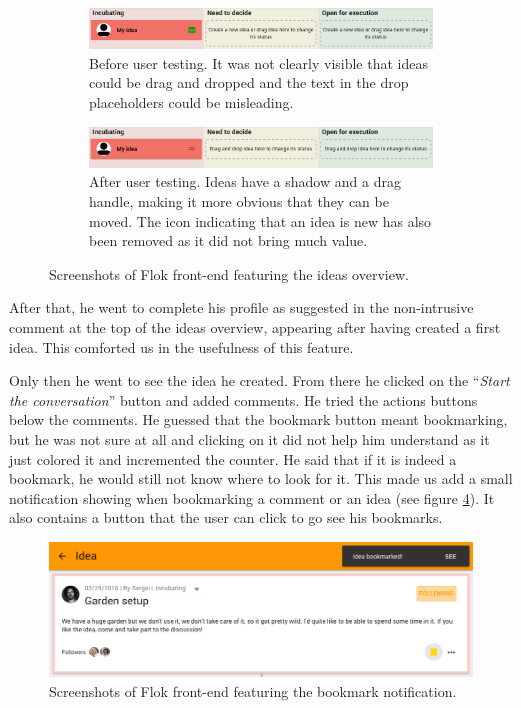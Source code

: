 \documentclass[a4paper,12pt, oneside]{article}
\begin{document}
\begin{figure}[!htb]
    \begin{subfigure}[t]{\textwidth}
        \includegraphics[width=\textwidth]{images/user_tests/ideasOverview_before.png}
        \caption{Before user testing. It was not clearly visible that ideas could be drag and dropped and the text in the drop placeholders could be misleading.}
        \label{fig.tests.ideasOverview.before}
    \end{subfigure}
    \begin{subfigure}[t]{\textwidth}
        \includegraphics[width=\textwidth]{images/user_tests/ideasOverview_after.png}
        \caption{After user testing. Ideas have a shadow and a drag handle, making it more obvious that they can be moved. The icon indicating that an idea is new has also been removed as it did not bring much value.}
        \label{fig.tests.ideasOverview.after}
    \end{subfigure}
    \caption{Screenshots of Flok front-end featuring the ideas overview.}
    \label{fig.tests.ideasOverview}
\end{figure}

After that, he went to complete his profile as suggested in the non-intrusive comment at the top of the ideas overview, appearing after having created a first idea.
This comforted us in the usefulness of this feature.

Only then he went to see the idea he created.
From there he clicked on the “\emph{Start the conversation}” button and added comments.
He tried the actions buttons below the comments.
He guessed that the bookmark button meant bookmarking, but he was not sure at all and clicking on it did not help him understand as it just colored it and incremented the counter.
He said that if it is indeed a bookmark, he would still not know where to look for it.
This made us add a small notification showing when bookmarking a comment or an idea (see figure \ref{fig.tests.bookmarkNotification}).
It also contains a button that the user can click to go see his bookmarks.

\begin{figure}[!htb]
    \centering
    \includegraphics[width=\textwidth]{images/user_tests/bookmarkNotification.png}
    \caption{Screenshots of Flok front-end featuring the bookmark notification.}
    \label{fig.tests.bookmarkNotification}
\end{figure}
\end{document}
